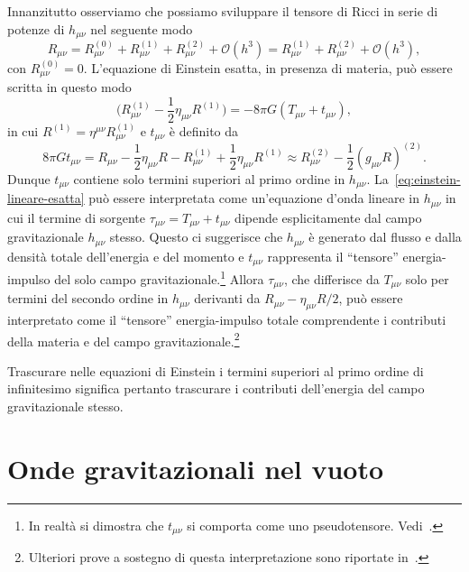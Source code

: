 Innanzitutto osserviamo che possiamo sviluppare il tensore di Ricci in serie di
potenze di $h_{\mu\nu}$ nel seguente modo
\begin{equation}
  R_{\mu\nu} = R_{\mu\nu}^{(0)} + R_{\mu\nu}^{(1)} + R_{\mu\nu}^{(2)} +
  \mathcal{O}(h^{3}) = R_{\mu\nu}^{(1)} + R_{\mu\nu}^{(2)} + \mathcal{O}(h^{3}),
\end{equation}
con $R_{\mu\nu}^{(0)} = 0$.  L'equazione di Einstein esatta, in presenza di
materia, può essere scritta in questo modo
\begin{equation}
  \label{eq:einstein-lineare-esatta}
  \bigg(R_{\mu\nu}^{(1)} - \frac{1}{2}\eta_{\mu\nu}R^{(1)}\bigg) = -8\pi
  G(T_{\mu\nu} + t_{\mu\nu}),
\end{equation}
in cui $R^{(1)} = \eta^{\mu\nu}R_{\mu\nu}^{(1)}$ e $t_{\mu\nu}$ è definito da
\begin{equation}
  8\pi G t_{\mu\nu} = R_{\mu\nu} - \frac{1}{2}\eta_{\mu\nu} R - R_{\mu\nu}^{(1)}
  + \frac{1}{2}\eta_{\mu\nu}R^{(1)} \approx R_{\mu\nu}^{(2)} -
  \frac{1}{2}(g_{\mu\nu}R)^{(2)}.
\end{equation}
Dunque $t_{\mu\nu}$ contiene solo termini superiori al primo ordine in
$h_{\mu\nu}$.  La~\eqref{eq:einstein-lineare-esatta} può essere interpretata
come un'equazione d'onda lineare in $h_{\mu\nu}$ in cui il termine di sorgente
$\tau_{\mu\nu} = T_{\mu\nu} + t_{\mu\nu}$ dipende esplicitamente dal campo
gravitazionale $h_{\mu\nu}$ stesso.  Questo ci suggerisce che $h_{\mu\nu}$ è
generato dal flusso e dalla densità totale dell'energia e del momento e
$t_{\mu\nu}$ rappresenta il ``tensore'' energia-impulso del solo campo
gravitazionale.\footnote{In realtà si dimostra che $t_{\mu\nu}$ si comporta come
  uno pseudotensore.  Vedi~\textcite[367-374]{landau:campi}.}
Allora $\tau_{\mu\nu}$, che differisce da $T_{\mu\nu}$ solo per termini del
secondo ordine in $h_{\mu\nu}$ derivanti da $R_{\mu\nu} - \eta_{\mu\nu}R/2$, può
essere interpretato come il ``tensore'' energia-impulso totale comprendente i
contributi della materia e del campo
gravitazionale.\footnote{Ulteriori prove a sostegno di questa interpretazione
  sono riportate in~\textcite[165-171]{weinberg:gravitation}.}

Trascurare nelle equazioni di Einstein i termini superiori al primo ordine di
infinitesimo significa pertanto trascurare i contributi dell'energia del campo
gravitazionale stesso.

\section{Onde gravitazionali nel vuoto}
\label{sec:onde-grav-vuoto}

